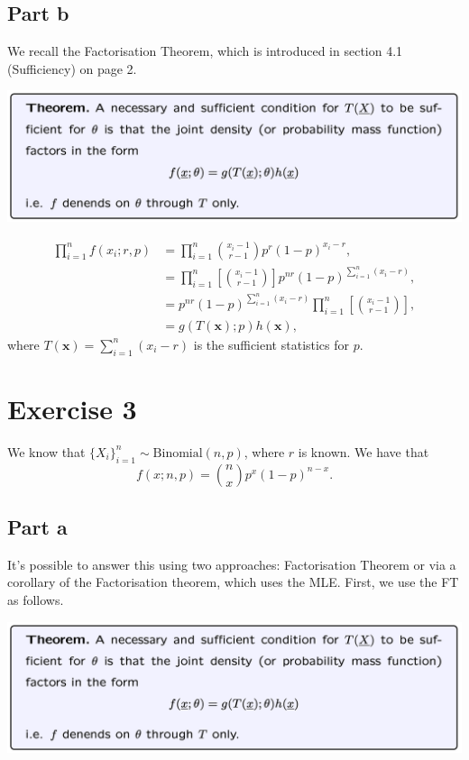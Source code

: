 \documentclass[12pt]{article}
\begin{document}
\subsection{Part b}
We recall the Factorisation Theorem, which is introduced in section 4.1 (Sufficiency) on page 2.

\includegraphics[width=1\linewidth]{Factorisation_theorem.png}

\begin{align}
\prod_{i=1}^{n} f(x_{i}; r, p) & = \prod_{i=1}^{n} {x_{i}-1 \choose r - 1}p^{r} (1-p)^{x_{i}-r}, \\
& = \prod_{i=1}^{n} \left[ {x_{i}-1 \choose r - 1} \right] p^{n r} (1-p)^{\sum_{i=1}^{n} (x_{i}-r)}, \\
& = p^{n r} (1-p)^{\sum_{i=1}^{n} (x_{i}-r)} \prod_{i=1}^{n} \left[ {x_{i}-1 \choose r - 1} \right], \\
& = g(T(\textbf{x}); p) h(\textbf{x}),
\end{align}
where $T(\textbf{x}) = \sum_{i=1}^{n} (x_{i}-r)$ is the sufficient statistics for $p$.

\section*{Exercise 3}

We know that $\{X_{i}\}_{i=1}^{n} \sim \mbox{Binomial}(n, p)$, where $r$ is known. We have that
\begin{equation}
f(x; n, p) = {n \choose x}p^{x} (1-p)^{n-x}.
\end{equation}

\subsection*{Part a}
It's possible to answer this using two approaches: Factorisation Theorem or via a corollary of the Factorisation theorem, which uses the MLE. First, we use the FT as follows.

\includegraphics[width=1\linewidth]{Factorisation_theorem.png}
\end{document}
